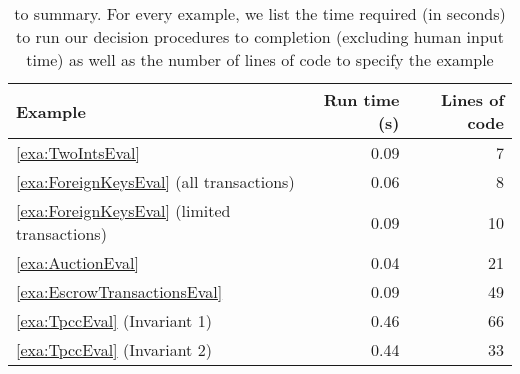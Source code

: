 \begin{table}[t]
  \centering
  \caption{%
     to  summary. For every
    example, we list the time required (in seconds) to run our decision
    procedures to completion (excluding human input time) as well as the number
    of lines of code to specify the example
  }%
  \begin{tabular}{lrr}
    \toprule
    Example                                          & Run time (s) & Lines of code \\\midrule
    \ref{exa:TwoIntsEval}                            & 0.09         & 7 \\
    \ref{exa:ForeignKeysEval} (all transactions)     & 0.06         & 8 \\
    \ref{exa:ForeignKeysEval} (limited transactions) & 0.09         & 10 \\
    \ref{exa:AuctionEval}                            & 0.04         & 21 \\
    \ref{exa:EscrowTransactionsEval}                 & 0.09         & 49 \\
    \ref{exa:TpccEval} (Invariant 1)                 & 0.46         & 66 \\
    \ref{exa:TpccEval} (Invariant 2)                 & 0.44         & 33 \\
    \bottomrule
  \end{tabular}
\end{table}
